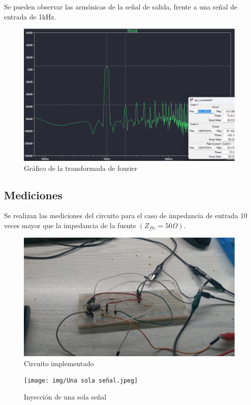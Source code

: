 Se pueden observar las armónicas de la señal de salida, frente a una señal de entrada de 1kHz.
\begin{figure}[h!]
    \centering
    \includegraphics[width=1.0\linewidth]{img/ftt1a.png}
    \caption{Gráfico de la transformada de fourier}
    \label{fig:fft1a}
\end{figure}

\subsection{Mediciones}

\hspace{1mm} Se realizan las mediciones del circuito para el caso de impedancia de entrada 10 veces mayor que la impedancia de la fuente \((Z_{fte}= 50\Omega)\).

\begin{figure}[h!]
    \centering
    \includegraphics[width=0.80\linewidth]{img/Circuito implementado.jpeg}
    \caption{Circuito implementado}
    
\end{figure}
\begin{figure}[h!]
    \centering
    \texttt{[image: img/Una sola señal.jpeg]}
    \caption{Inyección de una sola señal}
    
\end{figure}

